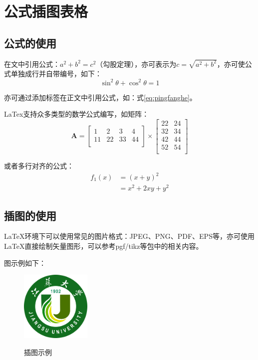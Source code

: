 
\chapter{公式插图表格}

\section{公式的使用}
在文中引用公式：$a^2+b^2=c^2$（勾股定理），亦可表示为$c=\sqrt{a^2+b^2}$，亦可使公式单独成行并自带编号，如下：
\begin{equation}
\sin^2{\theta}+\cos^2{\theta}=1 \label{eq:pingfanghe}
\end{equation}

亦可通过添加标签在正文中引用公式，如：式\eqref{eq:pingfanghe}。

LaTex支持众多类型的数学公式编写，如矩阵：
\begin{equation}
  \mathbf{A}=
  \left[\begin{matrix}
    1&2&3&4\\
    11&22&33&44\\
  \end{matrix}\right] \times
  \left[\begin{matrix}
    22&24\\
    32&34\\
    42&44\\
    52&54\\
  \end{matrix}\right]
\end{equation}

或者多行对齐的公式：
\begin{equation}
  \begin{aligned}
    f_1(x)&=(x+y)^2\\
          &=x^2+2xy+y^2
  \end{aligned}
\end{equation}


\section{插图的使用}

\LaTeX 环境下可以使用常见的图片格式：JPEG、PNG、PDF、EPS等，亦可使用\LaTeX 直接绘制矢量图形，可以参考pgf/tikz等包中的相关内容。

图示例如下：

\begin{figure}[!htb]
  \centering
  \includegraphics[width=0.3\textwidth]
  {figures/UJSlogo.png}\\
  \caption{插图示例}
  \label{fig:whu}
\end{figure}

